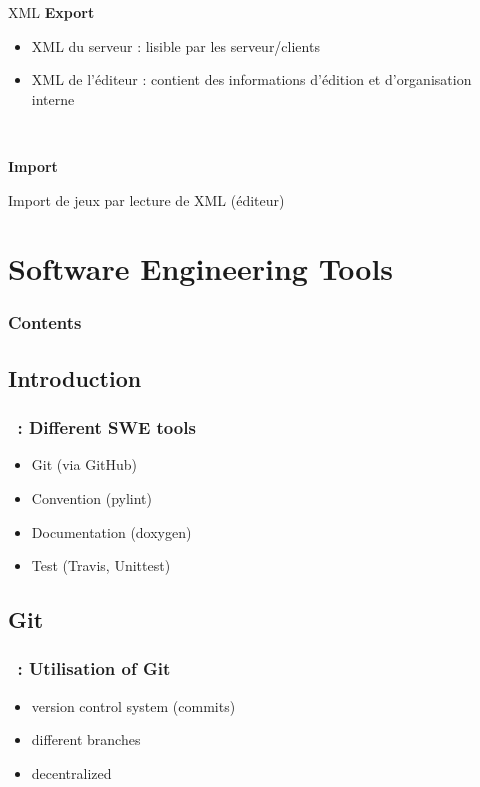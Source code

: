 \documentclass[11pt]{beamer}
\begin{document}
\begin{frame}{XML}
	\textbf{Export}
	\begin{itemize}
		\item XML du serveur : lisible par les serveur/clients
		\item XML de l'éditeur : contient des informations d'édition et d'organisation interne
	\end{itemize}
	
	~
	
	\textbf{Import}
	
	Import de jeux par lecture de XML (éditeur)
\end{frame}

\section{Software Engineering Tools}
 \begin{frame}
        \frametitle{Contents}
        \tableofcontents[currentsection]
    \end{frame}
\subsection{Introduction}

\begin{frame}
    \frametitle{\secname~: Different SWE tools}
    \begin{itemize}
        \item Git (via GitHub)
        \item Convention (pylint)
        \item Documentation (doxygen)
        \item Test (Travis, Unittest)
    \end{itemize}
\end{frame}

\subsection{Git}

\begin{frame}
    \frametitle{\secname~: Utilisation of Git}
    \begin{itemize}
        \item version control system (commits)
        \item different branches 
        \item decentralized
    \end{itemize}
\end{frame}
\end{document}
